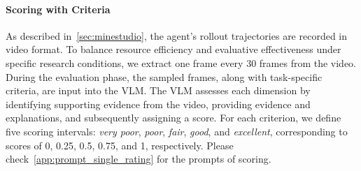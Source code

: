 \paragraph{Scoring with Criteria}
As described in~\cref{sec:minestudio}, the agent's rollout trajectories are recorded in video format. To balance resource efficiency and evaluative effectiveness under specific research conditions, we extract one frame every 30 frames from the video. During the evaluation phase, the sampled frames, along with task-specific criteria, are input into the VLM. The VLM assesses each dimension by identifying supporting evidence from the video, providing evidence and explanations, and subsequently assigning a score. For each criterion, we define five scoring intervals: \emph{very poor}, \emph{poor}, \emph{fair}, \emph{good}, and \emph{excellent}, corresponding to scores of 0, 0.25, 0.5, 0.75, and 1, respectively. Please check~\cref{app:prompt_single_rating} for the prompts of scoring.











